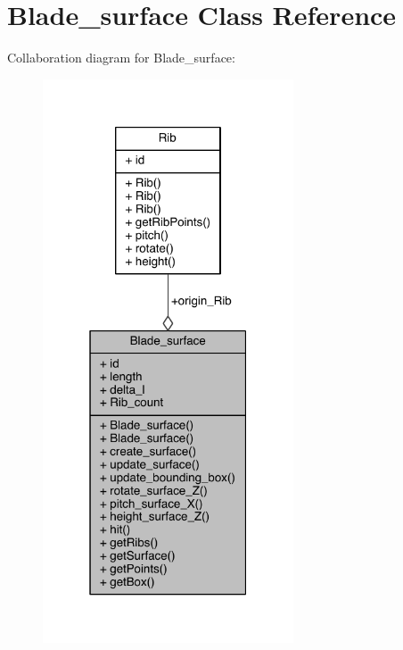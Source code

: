 \hypertarget{class_blade__surface}{}\section{Blade\+\_\+surface Class Reference}
\label{class_blade__surface}


Collaboration diagram for Blade\+\_\+surface\+:
\nopagebreak
\begin{figure}[H]
\begin{center}
\leavevmode
\includegraphics[width=211pt]{doxygen/latex/class_blade__surface__coll__graph}
\end{center}
\end{figure}
